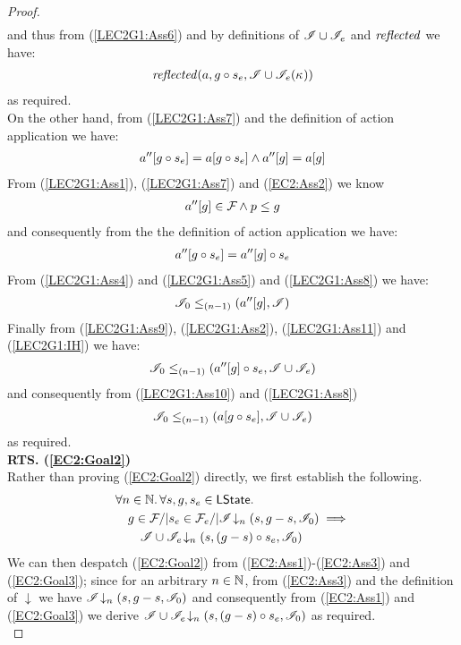 \begin{lemma}
\begin{proof}
\begin{align}
\end{align}
%
and thus from (\ref{LEC2G1:Ass6}) and by definitions of $\mathscr{I} \cup \mathscr{I}_e$ and $\mathit{reflected}$ we have:
%
\begin{align*}
	\mathit{reflected}(a, g \circ s_e, \mathscr{I} \cup \mathscr{I}_e(\kappa_{}))
\end{align*}
%
as required. \\
%
On the other hand, from (\ref{LEC2G1:Ass7}) and the definition of action application we have:
%
\begin{align}
	a''[g \circ s_e] = a[g \circ s_e] \land a''[g] = a[g] 
	\label{LEC2G1:Ass8}
\end{align}
%
From (\ref{LEC2G1:Ass1}), (\ref{LEC2G1:Ass7}) and (\ref{EC2:Ass2}) we know
%
\begin{align}
	a''[g] \in \mathcal{F}_{} \land p \leq g \label{LEC2G1:Ass9}
\end{align}
%
and consequently from the the definition of action application we have:
%
\begin{align}
	a''[g \circ s_e] = a''[g] \circ s_e \label{LEC2G1:Ass10}
\end{align}
%
From (\ref{LEC2G1:Ass4}) and (\ref{LEC2G1:Ass5}) and (\ref{LEC2G1:Ass8}) we have:
%
\begin{align}
	\mathscr{I}_0 \leq_{(n-1)}\left(a''[g], \mathscr{I}\right) \label{LEC2G1:Ass11}
\end{align}
%
Finally from (\ref{LEC2G1:Ass9}), (\ref{LEC2G1:Ass2}), (\ref{LEC2G1:Ass11}) and (\ref{LEC2G1:IH}) we have:
%
\begin{align*}
	\mathscr{I}_0 \leq_{(n-1)}\left(a''[g] \circ s_e, \mathscr{I} \cup \mathscr{I}_e\right)
\end{align*}
%
and consequently from (\ref{LEC2G1:Ass10}) and (\ref{LEC2G1:Ass8}) 
%
\begin{align*}
	\mathscr{I}_0 \leq_{(n-1)}\left(a[g \circ s_e], \mathscr{I} \cup \mathscr{I}_e\right)
\end{align*}
%
as required.\\



\noindent\textbf{RTS. (\ref{EC2:Goal2})} \\
Rather than proving (\ref{EC2:Goal2}) directly, we first establish the following.
%
\begin{align}
	& \forall n \in \mathbb{N}.\, \forall s, g, s_e \in \textsf{LState}.\, \nonumber\\
	& \quad g \in \mathcal{F}_{} /|  s_e \in \mathcal{F}_{e} /| \mathscr{I} \!\downarrow_{n} \left(s, g-s, \mathscr{I}_0\right) \implies \nonumber\\
	& \qquad \mathscr{I} \cup \mathscr{I}_e \!\downarrow_{n} \left(s, (g-s) \circ s_e, \mathscr{I}_0\right) \label{EC2:Goal3}
\end{align}
%
We can then despatch (\ref{EC2:Goal2}) from (\ref{EC2:Ass1})-(\ref{EC2:Ass3}) and (\ref{EC2:Goal3}); since for an arbitrary $n \in \mathbb{N}$, from (\ref{EC2:Ass3}) and the definition of $\downarrow$ we have $\mathscr{I} \!\downarrow_{n} \left(s, g-s, \mathscr{I}_0\right)$ and consequently from (\ref{EC2:Ass1}) and (\ref{EC2:Goal3}) we derive $\mathscr{I} \cup \mathscr{I}_e \!\downarrow_{n} \left(s, (g-s) \circ s_e, \mathscr{I}_0\right) $ as required. \\


\end{proof}
\end{lemma}
